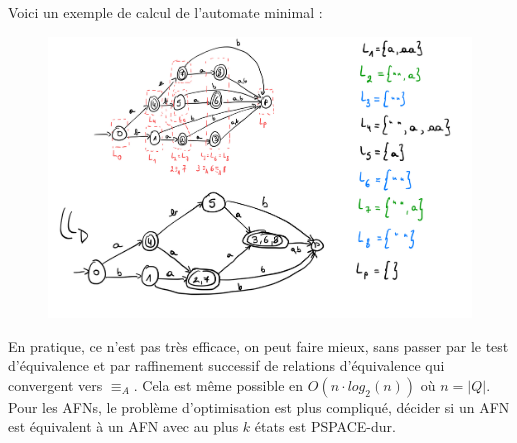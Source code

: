 \begin{example}
    Voici un exemple de calcul de l'automate minimal :
    \begin{figure}[H]
        \centering
        \includegraphics[scale=0.3]{pictures/automate_minimal.jpeg}
    \end{figure}
\end{example}
En pratique, ce n'est pas très efficace, on peut faire mieux, sans passer par le test d'équivalence et par raffinement 
successif de relations d'équivalence qui convergent vers $\equiv_A$. Cela est même possible en $O(n\cdot log_2(n))$ où
$n=|Q|$. Pour les AFNs, le problème d'optimisation est plus compliqué, décider si un AFN est équivalent à un AFN avec au 
plus $k$ états est PSPACE-dur.